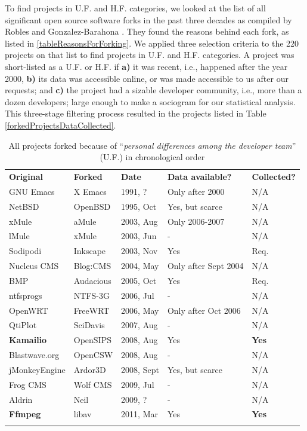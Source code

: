 \documentclass{acm_proc_article-sp}
\begin{document}
To find projects in U.F. and H.F. categories, we looked at the list of all significant open source software forks in the past three decades as compiled by Robles and Gonzalez-Barahona \cite{Robles}. They found the reasons behind each fork, as listed in \ref{tableReasonsForForking}. We applied three selection criteria to the 220 projects on that list to find projects in U.F. and H.F. categories. A project was short-listed as a U.F. or H.F. if \textbf{a)} it was recent, i.e., happened after the year 2000, \textbf{b)} its data was accessible online, or was made accessible to us after our requests; and \textbf{c)} the project had a sizable developer community, i.e., more than a dozen developers; large enough to make a sociogram for our statistical analysis. This three-stage filtering process resulted in the projects listed in Table \ref{forkedProjectsDataCollected}.

\begin{table}[!ht]
\centering
\caption{All projects forked because of ``\textit{personal differences among the developer team}'' (U.F.) \cite{Robles} in chronological order}
\label{tabelProjectsForkedCat1PersonalDiffereces}       
\begin{tabular}{m{} m{} m{} m{} m{}}
\hline\noalign{\smallskip}
\textbf{Original} & \textbf{Forked} & \textbf{Date} & \textbf{Data available?} & \textbf{Collected?}\\
\noalign{\smallskip}\hline\noalign{\smallskip}
GNU Emacs & X Emacs & 1991, ? & Only after 2000 & N/A \\ \hline
NetBSD & OpenBSD & 1995, Oct & Yes, but scarce & N/A \\ \hline
xMule & aMule & 2003, Aug & Only 2006-2007 & N/A \\ \hline
lMule & xMule & 2003, Jun & - & N/A \\ \hline
Sodipodi & Inkscape & 2003, Nov & Yes & Req.\\ \hline
Nucleus CMS & Blog:CMS & 2004, May & Only after Sept 2004 & N/A \\ \hline
BMP & Audacious & 2005, Oct & Yes & Req. \\ \hline
ntfsprogs & NTFS-3G & 2006, Jul & - & N/A \\ \hline
OpenWRT & FreeWRT & 2006, May & Only after Oct 2006 & N/A \\ \hline
QtiPlot & SciDavis & 2007, Aug & - & N/A \\ \hline
\textbf{Kamailio} & OpenSIPS & 2008, Aug & Yes & \textbf{Yes} \\ \hline
Blastwave.org & OpenCSW & 2008, Aug & - & N/A \\ \hline
jMonkeyEngine & Ardor3D & 2008, Sept & Yes, but scarce & N/A \\ \hline
Frog CMS & Wolf CMS & 2009, Jul & - & N/A \\ \hline
Aldrin & Neil & 2009, ? & - & N/A \\ \hline
\textbf{Ffmpeg} & libav & 2011, Mar & Yes & \textbf{Yes}\\
\noalign{\smallskip}\hline
\end{tabular}
\end{table}
\end{document}
